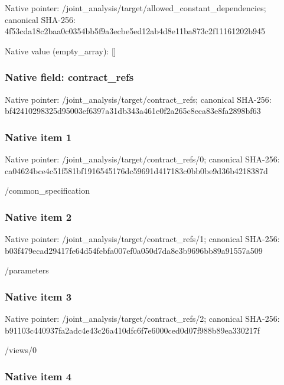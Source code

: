 \documentclass[10pt,a4paper]{article}
\begin{document}
Native pointer: /joint\_analysis/target/a\allowbreak{}llowed\_constant\_dependen\allowbreak{}cies; canonical SHA-256: 4f53cda18c2baa0c0354bb5f\allowbreak{}9a3ecbe5ed12ab4d8e11ba87\allowbreak{}3c2f11161202b945



Native value (empty\_array): []



\subsubsection{Native field: contract\_refs}


Native pointer: /joint\_analysis/target/contract\_refs; canonical SHA-256: bf42410298325d95003ef639\allowbreak{}7a31db343a461e0f2a265c8e\allowbreak{}ca83e8fa2898bf63



\subsubsection{Native item 1}


Native pointer: /joint\_analysis/target/contract\_refs/0; canonical SHA-256: ca04624bce4c51f581bf1916\allowbreak{}545176dc59691d417183c0bb\allowbreak{}0be9d36b4218387d


/common\_specification


\subsubsection{Native item 2}


Native pointer: /joint\_analysis/target/contract\_refs/1; canonical SHA-256: b03f479ecad29417fe64d54f\allowbreak{}ebfa007ef0a050d7da8e3b96\allowbreak{}96bb89a91557a509


/parameters


\subsubsection{Native item 3}


Native pointer: /joint\_analysis/target/contract\_refs/2; canonical SHA-256: b91103c440937fa2adc4e43c\allowbreak{}26a410dfc6f7e6000ced0d07\allowbreak{}f988b89ea330217f


/views/0


\subsubsection{Native item 4}
\end{document}
